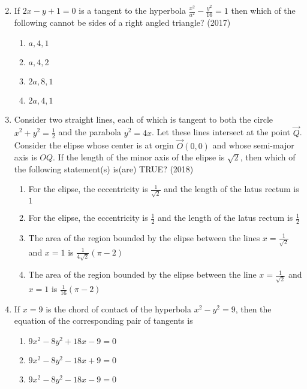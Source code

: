 \begin{enumerate}
\begin{multicols}{2}
\begin{enumerate}
	       \end{enumerate}
\end{multicols}
      \item If $2x-y+1=0$ is a tangent to the hyperbola $\frac{x^2}{a^2}-\frac{y^2}{16}=1$ then which of the following cannot be sides of a right angled triangle? 
	      \hfill(2017)
	       \begin{multicols}{4}
\begin{enumerate}
		      \item $a,4,1$
		      \item $a,4,2$
		      \item $2a,8,1$
		      \item $2a,4,1$
	       \end{enumerate}
\end{multicols}
%
      \item Consider two straight lines, each of which is tangent to both the circle $x^2+y^2=\frac{1}{2}$
	      and the parabola $y^2=4x$. Let these lines intersect at the point $\vec{Q}$. Consider the elipse whose center is at orgin $\vec{O}(0,0)$ and whose semi-major axis is $OQ$.
	      If the length of the minor axis of the elipse is $\sqrt{2}$, then which of the following statement(s) is(are) TRUE? 
	      \hfill(2018)
%	      
\begin{enumerate}
		      \item For the elipse, the eccentricity is $\frac{1}{\sqrt{2}}$ and the length of the latus rectum is $1$
%
		      \item For the elipse, the eccentricity is $\frac{1}{2}$ and the length of the latus rectum is $\frac{1}{2}$
		      \item The area of the region bounded by the elipse between the lines $x=\frac{1}{\sqrt{2}}$ and $x=1$ is $\frac{1}{4\sqrt{2}}(\pi-2)$
		      \item The area of the region bounded by the elipse between the line $x=\frac{1}{\sqrt{2}}$ and $x=1$ is $\frac{1}{16}(\pi-2)$
	       \end{enumerate}
%
\item If $x=9$ is the chord of contact of the hyperbola $x^2-y^2=9$, then the equation of the corresponding pair of tangents is
    \hfill {}
\begin{multicols}{2}
\begin{enumerate}
    \item $9x^2-8y^2+18x-9=0$
    \item $9x^2-8y^2-18x+9=0$
    \item $9x^2-8y^2-18x-9=0$

\end{enumerate}
\end{multicols}
\end{enumerate}
